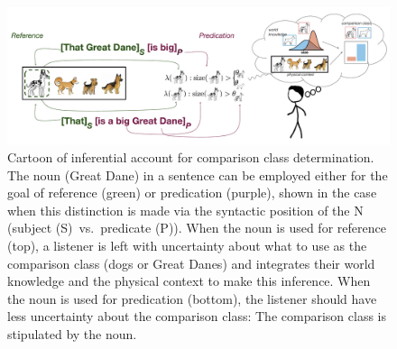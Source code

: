 \documentclass[10pt,letterpaper]{article}
\begin{document}


\begin{figure}[t]
\begin{center}
\includegraphics[width=0.9\linewidth]{ref-pred-cartoon-w-subscripts2.pdf}
\end{center}
\caption{Cartoon of inferential account for comparison class determination. The noun (Great Dane) in a sentence can be employed either for the goal of reference (green) or predication (purple), shown in the case when this distinction is made via the syntactic position of the N (subject (S)~vs.~predicate (P)). When the noun is used for reference (top), a listener is left with uncertainty about what to use as the comparison class (dogs or Great Danes) and integrates their world knowledge and the physical context to make this inference.  When the noun is used for predication (bottom), the listener should have less uncertainty about the comparison class: The comparison class is stipulated by the noun.}
\label{model-cartoon}
\end{figure}
\end{document}

